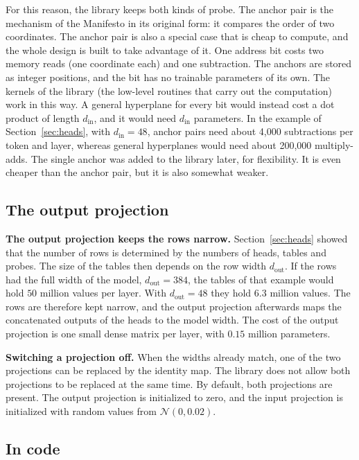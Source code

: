 \documentclass[11pt]{article}
\begin{document}
For this reason, the library keeps both kinds of probe. The anchor pair is the mechanism of the Manifesto
in its original form: it compares the order of two coordinates. The anchor pair is also a special case
that is cheap to compute, and the whole design is built to take advantage of it. One address bit costs
two memory reads (one coordinate each) and one subtraction. The anchors are stored as integer positions,
and the bit has no trainable parameters of its own. The kernels of the library (the low-level routines
that carry out the computation) work in this way. A general hyperplane for every bit would instead cost a
dot product of length $d_\text{in}$, and it would need $d_\text{in}$ parameters. In the example of
Section~\ref{sec:heads}, with $d_\text{in}=48$, anchor pairs need about 4{,}000 subtractions per token and
layer, whereas general hyperplanes would need about 200{,}000 multiply-adds. The single anchor was added
to the library later, for flexibility. It is even cheaper than the anchor pair, but it is also somewhat
weaker.

\subsection{The output projection}

\textbf{The output projection keeps the rows narrow.} Section~\ref{sec:heads} showed that the number of
rows is determined by the numbers of heads, tables and probes. The size of the tables then depends on the
row width $d_\text{out}$. If the rows had the full width of the model, $d_\text{out}=384$, the tables of
that example would hold $50$ million values per layer. With $d_\text{out}=48$ they hold $6.3$ million
values. The rows are therefore kept narrow, and the output projection afterwards maps the concatenated
outputs of the heads to the model width. The cost of the output projection is one small dense matrix per
layer, with $0.15$ million parameters.

\textbf{Switching a projection off.} When the widths already match, one of the two projections can be
replaced by the identity map. The library does not allow both projections to be replaced at the same
time. By default, both projections are present. The output projection is initialized to zero, and the
input projection is initialized with random values from $\mathcal{N}(0,0.02)$.

\subsection{In code}
\end{document}
